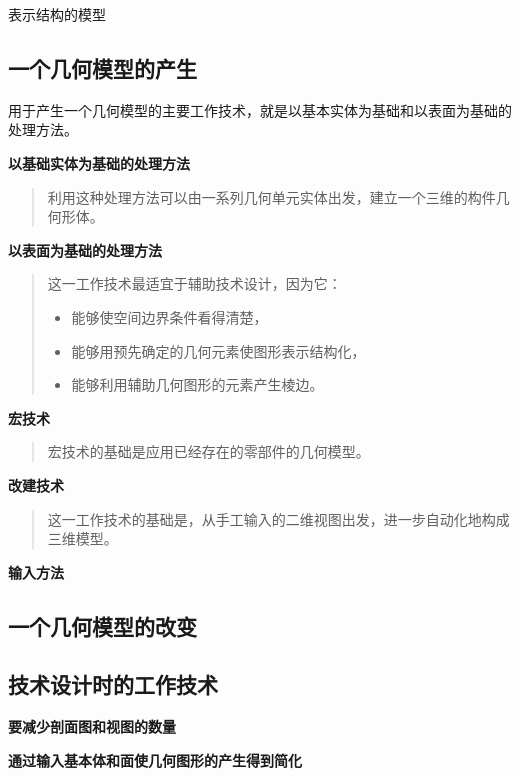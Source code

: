 \documentclass[letterpaper,10pt,english]{sphinxmanual}
\begin{document}
表示结构的模型


\subsection{一个几何模型的产生}
\label{unit10:id10}
用于产生一个几何模型的主要工作技术，就是以基本实体为基础和以表面为基础的处理方法。

\textbf{以基础实体为基础的处理方法}
\begin{quote}

利用这种处理方法可以由一系列几何单元实体出发，建立一个三维的构件几何形体。
\end{quote}

\textbf{以表面为基础的处理方法}
\begin{quote}

这一工作技术最适宜于辅助技术设计，因为它：
\begin{itemize}
\item {} 
能够使空间边界条件看得清楚，

\item {} 
能够用预先确定的几何元素使图形表示结构化，

\item {} 
能够利用辅助几何图形的元素产生棱边。

\end{itemize}
\end{quote}

\textbf{宏技术}
\begin{quote}

宏技术的基础是应用已经存在的零部件的几何模型。
\end{quote}

\textbf{改建技术}
\begin{quote}

这一工作技术的基础是，从手工输入的二维视图出发，进一步自动化地构成三维模型。
\end{quote}

\textbf{输入方法}


\subsection{一个几何模型的改变}
\label{unit10:id11}

\subsection{技术设计时的工作技术}
\label{unit10:id12}
\textbf{要减少剖面图和视图的数量}

\textbf{通过输入基本体和面使几何图形的产生得到简化}
\end{document}
